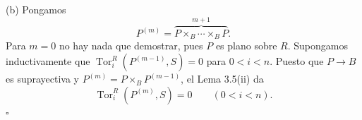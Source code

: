(b) Pongamos
\[
 P^{(m)}=\overbrace{P\times_B\cdots\times_BP}^{m+1}.
\]
Para $m=0$ no hay nada que demostrar, pues $P$ es plano sobre $R$.
Supongamos inductivamente que
$\operatorname{Tor}_i^R(P^{(m-1)},S)=0$ para $0<i<n$. Puesto que
$P\longrightarrow B$ es suprayectiva y
$P^{(m)}=P\times_BP^{(m-1)}$, el Lema 3.5(ii) da
\[
 \operatorname{Tor}_i^R(P^{(m)},S)=0\qquad(0<i<n).
\]
\hfill$\square$
